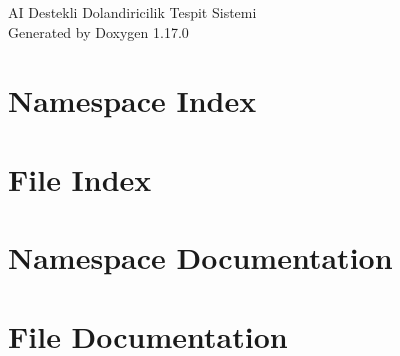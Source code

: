\documentclass[twoside]{book}
\newcommand{\+}{\discretionary{\mbox{\scriptsize$\hookleftarrow$}}{}{}}
\newcommand{\clearemptydoublepage}{%
    \newpage{\pagestyle{empty}\cleardoublepage}%
  }
\begin{document}
  \raggedbottom
    \hypersetup{pageanchor=false,
                bookmarksnumbered=true,
                pdfencoding=unicode
               }
  \begin{titlepage}
  \vspace*{7cm}
  \begin{center}%
  {\Large AI Destekli Dolandiricilik Tespit Sistemi}\\
  \vspace*{1cm}
  {\large Generated by Doxygen 1.17.0}\\
  \end{center}
  \end{titlepage}
  \clearemptydoublepage
  \tableofcontents
  \clearemptydoublepage
  \hypersetup{pageanchor=true}
\chapter{Namespace Index}

\chapter{File Index}

\chapter{Namespace Documentation}


\chapter{File Documentation}


  \backmatter
  \newpage
  \clearemptydoublepage
  \printindex
\end{document}
